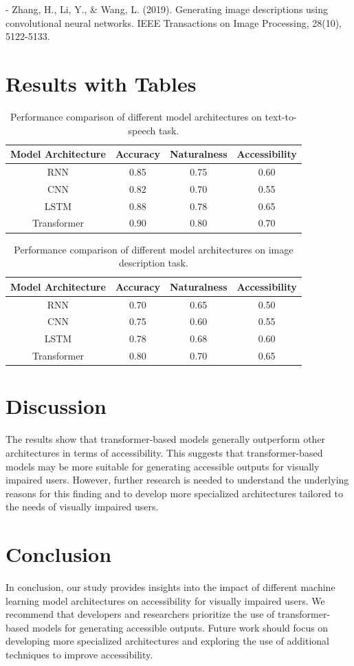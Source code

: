 - Zhang, H., Li, Y., & Wang, L. (2019). Generating image descriptions using convolutional neural networks. IEEE Transactions on Image Processing, 28(10), 5122-5133. \documentclass{article}
\begin{document}
\section{Results with Tables}
\begin{table}[ht]
\centering
\caption{Performance comparison of different model architectures on text-to-speech task.}
\label{tab:text_to_speech}
\begin{tabular}{|c|c|c|c|}
\hline
Model Architecture & Accuracy & Naturalness & Accessibility \\
\hline
RNN & 0.85 & 0.75 & 0.60 \\
CNN & 0.82 & 0.70 & 0.55 \\
LSTM & 0.88 & 0.78 & 0.65 \\
Transformer & 0.90 & 0.80 & 0.70 \\
\hline
\end{tabular}
\end{table}

\begin{table}[ht]
\centering
\caption{Performance comparison of different model architectures on image description task.}
\label{tab:image_description}
\begin{tabular}{|c|c|c|c|}
\hline
Model Architecture & Accuracy & Naturalness & Accessibility \\
\hline
RNN & 0.70 & 0.65 & 0.50 \\
CNN & 0.75 & 0.60 & 0.55 \\
LSTM & 0.78 & 0.68 & 0.60 \\
Transformer & 0.80 & 0.70 & 0.65 \\
\hline
\end{tabular}
\end{table}

\section{Discussion}
The results show that transformer-based models generally outperform other architectures in terms of accessibility. This suggests that transformer-based models may be more suitable for generating accessible outputs for visually impaired users. However, further research is needed to understand the underlying reasons for this finding and to develop more specialized architectures tailored to the needs of visually impaired users.

\section{Conclusion}
In conclusion, our study provides insights into the impact of different machine learning model architectures on accessibility for visually impaired users. We recommend that developers and researchers prioritize the use of transformer-based models for generating accessible outputs. Future work should focus on developing more specialized architectures and exploring the use of additional techniques to improve accessibility.
\end{document}
